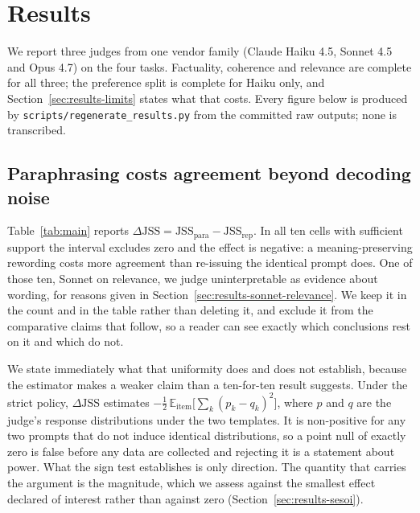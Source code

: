 \section{Results}
\label{sec:results}

We report three judges from one vendor family (Claude Haiku 4.5, Sonnet 4.5 and
Opus 4.7) on the four tasks. Factuality, coherence and relevance are
complete for all three; the preference split is complete for Haiku only, and
Section~\ref{sec:results-limits} states what that costs. Every figure below is
produced by \texttt{scripts/regenerate\_results.py} from the committed raw
outputs; none is transcribed.



\subsection{Paraphrasing costs agreement beyond decoding noise}

Table~\ref{tab:main} reports $\Delta\mathrm{JSS} = \mathrm{JSS}_{\text{para}} -
\mathrm{JSS}_{\text{rep}}$. In all ten cells with sufficient support the interval
excludes zero and the effect is negative: a meaning-preserving rewording costs
more agreement than re-issuing the identical prompt does. One of those ten, Sonnet on relevance, we judge uninterpretable as evidence about
wording, for
reasons given in Section~\ref{sec:results-sonnet-relevance}. We keep it in the
count and in the table rather than deleting it, and exclude it from the
comparative claims that follow, so a reader can see exactly which conclusions
rest on it and which do not.

We state immediately what that uniformity does and does not establish, because
the estimator makes a weaker claim than a ten-for-ten result suggests. Under the
strict policy, $\Delta\mathrm{JSS}$ estimates
$-\tfrac{1}{2}\,\mathbb{E}_{\text{item}}\big[\sum_k (p_k - q_k)^2\big]$, where
$p$ and $q$ are the judge's response distributions under the two templates. It is
non-positive for any two prompts that do not induce identical distributions, so
a point null of exactly zero is false before any data are collected and rejecting
it is a statement about power. What the sign test establishes is only direction.
The quantity that carries the argument is the magnitude, which we assess against
the smallest effect declared of interest rather than against zero
(Section~\ref{sec:results-sesoi}).


